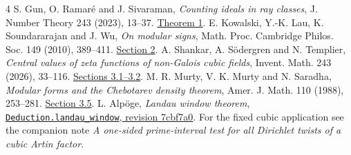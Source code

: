 \documentclass[11pt,a4paper]{article}
\begin{document}
\small
\begin{thebibliography}{4}
 S. Gun, O. Ramar\'e and J. Sivaraman, \emph{Counting ideals in ray classes}, J. Number Theory 243 (2023), 13--37. \href{https://doi.org/10.1016/j.jnt.2022.08.005}{Theorem 1}.
 E. Kowalski, Y.-K. Lau, K. Soundararajan and J. Wu, \emph{On modular signs}, Math. Proc. Cambridge Philos. Soc. 149 (2010), 389--411. \href{https://doi.org/10.1017/S030500411000040X}{Section 2}.
 A. Shankar, A. S\"odergren and N. Templier, \emph{Central values of zeta functions of non-Galois cubic fields}, Invent. Math. 243 (2026), 33--116. \href{https://doi.org/10.1007/s00222-025-01373-6}{Sections 3.1--3.2}.
 M. R. Murty, V. K. Murty and N. Saradha, \emph{Modular forms and the Chebotarev density theorem}, Amer. J. Math. 110 (1988), 253--281. \href{https://web.williams.edu/Mathematics/sjmiller/public_html/ntandrmt/handouts/murty/Murty_ModularFormsChebotarevDensity.pdf}{Section 3.5}.
 L. Alp\"oge, \emph{Landau window theorem}, \href{https://github.com/CocoSgt/riemann-hypothesis-lean/blob/7cbf7a0c32fca1badf05931879a37c3f8a2b03b4/src/Development/AutomorphicArithmetic/DedekindLFunctions/LandauTheorems/landauWindow.lean}{\texttt{Deduction.landau\_window}, revision 7cbf7a0}. For the fixed cubic application see the companion note \emph{A one-sided prime-interval test for all Dirichlet twists of a cubic Artin factor}.
\end{thebibliography}
\end{document}
